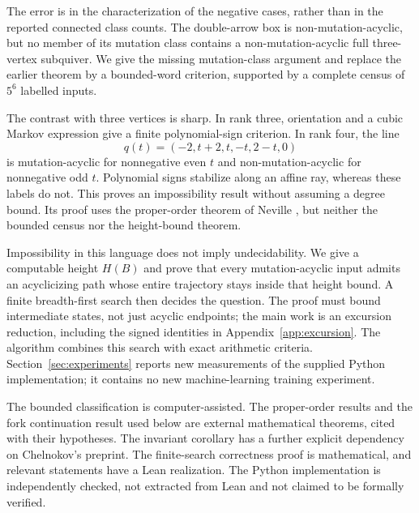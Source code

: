 \documentclass[11pt]{amsart}
\theoremstyle{definition}\newtheorem{definition}[theorem]{Definition}
\theoremstyle{remark}\newtheorem{remark}[theorem]{Remark}
\begin{document}
The error is in the characterization of the negative cases, rather than in the reported connected class counts. The double-arrow box is non-mutation-acyclic, but no member of its mutation class contains a non-mutation-acyclic full three-vertex subquiver. We give the missing mutation-class argument and replace the earlier theorem by a bounded-word criterion, supported by a complete census of $5^6$ labelled inputs.

The contrast with three vertices is sharp. In rank three, orientation and a cubic Markov expression give a finite polynomial-sign criterion. In rank four, the line
\[
 q(t)=(-2,t+2,t,-t,2-t,0)
\]
is mutation-acyclic for nonnegative even $t$ and non-mutation-acyclic for nonnegative odd $t$. Polynomial signs stabilize along an affine ray, whereas these labels do not. This proves an impossibility result without assuming a degree bound. Its proof uses the proper-order theorem of Neville \cite{Neville}, but neither the bounded census nor the height-bound theorem.

Impossibility in this language does not imply undecidability. We give a computable height $H(B)$ and prove that every mutation-acyclic input admits an acyclicizing path whose entire trajectory stays inside that height bound. A finite breadth-first search then decides the question. The proof must bound intermediate states, not just acyclic endpoints; the main work is an excursion reduction, including the signed identities in Appendix~\ref{app:excursion}. The algorithm combines this search with exact arithmetic criteria. Section~\ref{sec:experiments} reports new measurements of the supplied Python implementation; it contains no new machine-learning training experiment.

The bounded classification is computer-assisted. The proper-order results and the fork continuation result used below are external mathematical theorems, cited with their hypotheses. The invariant corollary has a further explicit dependency on Chelnokov's preprint. The finite-search correctness proof is mathematical, and relevant statements have a Lean realization. The Python implementation is independently checked, not extracted from Lean and not claimed to be formally verified.
\end{document}
